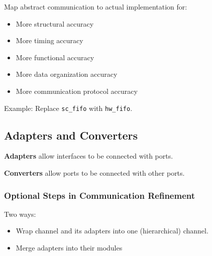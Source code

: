 Map abstract communication to actual implementation for:
\begin{itemize}
    \item More structural accuracy
    \item More timing accuracy
    \item More functional accuracy
    \item More data organization accuracy
    \item More communication protocol accuracy
\end{itemize}

Example: Replace \lstinline{sc_fifo} with \lstinline{hw_fifo}.

\subsection{Adapters and Converters}
\textbf{Adapters} allow interfaces to be connected with ports.

\textbf{Converters} allow ports to be connected with other ports.

\subsubsection{Optional Steps in Communication Refinement}
Two ways:
\begin{itemize}
    \item Wrap channel and its adapters into one (hierarchical) channel.
    \item Merge adapters into their modules
\end{itemize}

